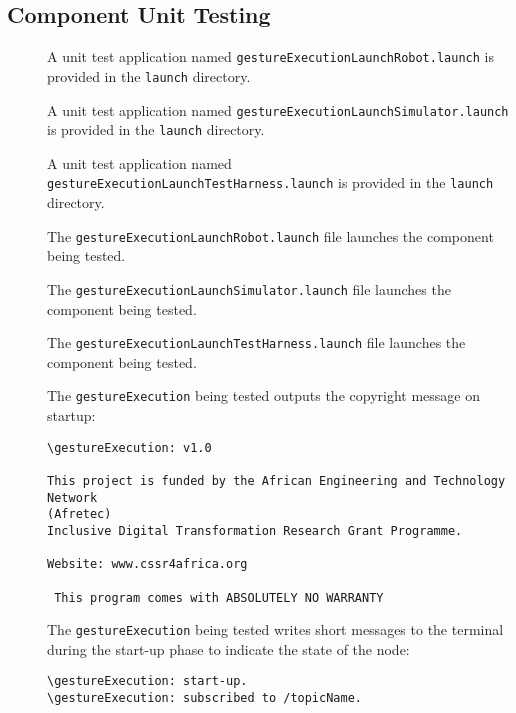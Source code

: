 \documentclass{CSSRforAfrica}
\newcommand{\checkboxChecked}{\fbox{\ding{51}}} %
\newcommand{\checkboxDashed}{\fbox{--}}         %
\begin{document}
\subsection{Component Unit Testing}
\label{subsection:gesture_execution_test_unit_testing}


\begin{description}
\item[\checkboxChecked] A unit test application named {\small \verb+gestureExecutionLaunchRobot.launch+} is provided in the {\small \verb+launch+} directory. 

\item[\checkboxChecked] A unit test application named {\small \verb+gestureExecutionLaunchSimulator.launch+} is provided in the {\small \verb+launch+} directory. 

\item[\checkboxChecked] A unit test application named {\small \verb+gestureExecutionLaunchTestHarness.launch+} is provided in the {\small \verb+launch+} directory. 

\item[\checkboxChecked] The {\small \verb+gestureExecutionLaunchRobot.launch+} file  launches the component being tested.

\item[\checkboxDashed] The {\small \verb+gestureExecutionLaunchSimulator.launch+} file  launches the component being tested.

\item[\checkboxChecked] The {\small \verb+gestureExecutionLaunchTestHarness.launch+} file  launches the component being tested.

\item[\checkboxChecked]  The {\small \verb+gestureExecution+} being tested outputs the copyright message on startup:
\begin{verbatim}
\gestureExecution: v1.0
 
This project is funded by the African Engineering and Technology Network 
(Afretec) 
Inclusive Digital Transformation Research Grant Programme.
 
Website: www.cssr4africa.org
 
 This program comes with ABSOLUTELY NO WARRANTY
\end{verbatim}

\newpage
\item[\checkboxChecked]  The {\small \verb+gestureExecution+} being tested writes short messages to the terminal during the start-up phase to
 indicate the state of the node:
\begin{verbatim}
\gestureExecution: start-up.
\gestureExecution: subscribed to /topicName.
\end{verbatim}


\end{description}
\end{document}
